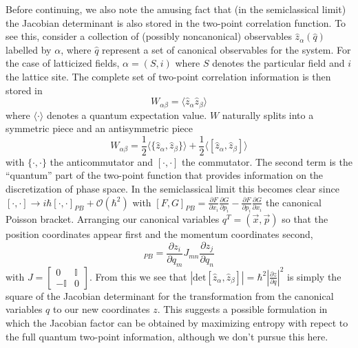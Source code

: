\documentclass[11pt,a4paper]{article}
\def\det{\mathrm{det}}
\begin{document}

Before continuing, we also note the amusing fact that (in the semiclassical limit) the Jacobian determinant is also stored in the two-point correlation function.
To see this, consider a collection of (possibly noncanonical) observables $\hat{z}_\alpha(\hat{q})$ labelled by $\alpha$, 
where $\hat{q}$ represent a set of canonical observables for the system.
For the case of latticized fields, $\alpha = (S,i)$ where $S$ denotes the particular field and $i$ the lattice site.
The complete set of two-point correlation information is then stored in
\begin{equation}
  W_{\alpha\beta} = \langle \hat{z}_\alpha\hat{z}_\beta\rangle
\end{equation}
where $\langle\cdot\rangle$ denotes a quantum expectation value.
$W$ naturally splits into a symmetric piece and an antisymmetric piece
\begin{equation}
  W_{\alpha\beta} = \frac{1}{2}\langle \{\hat{z}_\alpha,\hat{z}_\beta\} \rangle + \frac{1}{2}\langle [\hat{z}_\alpha,\hat{z}_\beta] \rangle
\end{equation}
with $\{\cdot,\cdot\}$ the anticommutator and $[\cdot,\cdot]$ the commutator.
The second term is the ``quantum'' part of the two-point function that provides information on the discretization of phase space.
In the semiclassical limit this becomes clear since $[\cdot,\cdot] \to i\hbar[\cdot,\cdot]_{PB} + \mathcal{O}(\hbar^2)$ with $[F,G]_{PB} = \frac{\partial F}{\partial x_i}\frac{\partial G}{\partial p_i} - \frac{\partial F}{\partial p_i}\frac{\partial G}{\partial x_i}$ the canonical Poisson bracket.
Arranging our canonical variables $q^T = ( \vec{x}, \vec{p} )$ so that the position coordinates appear first and the momentum coordinates second,
\begin{equation}
  [z_i,z_j]_{PB} = \frac{\partial{z_i}}{\partial{q_m}}J_{mn}\frac{\partial{z_j}}{\partial{q_n}}
\end{equation}
with $J = \left[\begin{array}{cc} 0 & \mathbb{I} \\ -\mathbb{I} & 0\end{array}\right]$.
From this we see that $|\det [\hat{z}_\alpha,\hat{z}_\beta] | = \hbar^2\left|\frac{\partial z}{\partial q}\right|^2$ is simply the square of the Jacobian determinant for the transformation from the canonical variables $q$ to our new coordinates $z$.
This suggests a possible formulation in which the Jacobian factor can be obtained by maximizing entropy with repect to the full quantum two-point information, although we don't pursue this here.
\end{document}

